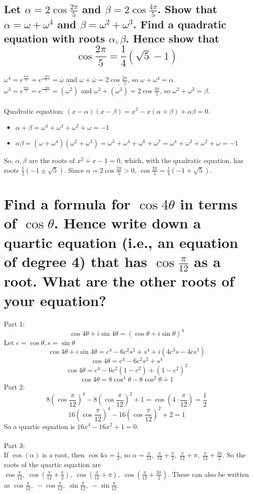 \documentclass[12pt]{article}
\begin{document}
\subsection{
    Let $\alpha = 2\cos\frac{2 \pi}{5}$ and $\beta = 2\cos\frac{4 \pi}{5}$.
    Show that $\alpha = \omega + \omega ^4$ and $\beta = \omega ^2 + \omega ^3$.
    Find a quadratic equation with roots $\alpha, \beta$. Hence show that
    $$\cos\frac{2 \pi}{5} = \frac{1}{4}(\sqrt{5}-1)$$
}
$\omega ^4 = e^{\frac{8 \pi i}{5}} = e^{\frac{-2 \pi i}{5}} = \bar{\omega}$ 
and $\omega + \bar{\omega} = 2\cos\frac{2 \pi}{5}$, so $\omega + \omega ^4 = \alpha$.\\
$\omega ^3 = e^{\frac{6 \pi i}{5}} = e^{\frac{-4 \pi i}{5}} = \bar{(\omega ^2)}$ 
and $\omega ^2 + \bar{(\omega ^2)} = 2\cos\frac{4 \pi}{5}$, so $\omega ^2 + \omega ^3 = \beta$.\\\\

Quadratic equation: $(x - \alpha)(x - \beta) = x^2 - x(\alpha + \beta) + \alpha \beta = 0$.
\begin{itemize}
    \item $\alpha + \beta = \omega ^4 + \omega ^3 + \omega ^2 + \omega = -1$
    \item $\alpha \beta = (\omega + \omega ^4)(\omega ^2 + \omega ^3) = \omega ^3 + \omega ^4 + \omega ^6 + \omega ^7 = \omega ^4 + \omega ^3 + \omega ^2 + \omega = -1$
\end{itemize}
So, $\alpha, \beta$ are the roots of $x^2 + x - 1 = 0$, which, with the quadratic equation, has roots $\frac{1}{2}(-1 \pm \sqrt{5})$.
Since $\alpha = 2\cos\frac{2 \pi}{5} > 0$, $\cos\frac{2 \pi}{5} = \frac{1}{4}(-1+\sqrt{5})$.

\section{
    Find a formula for $\cos 4 \theta$ in terms of $\cos \theta$.
    Hence write down a quartic equation (i.e., an equation of degree 4) that has $\cos \frac{\pi}{12}$ as a root.
    What are the other roots of your equation?
}
Part 1:
$$\cos 4 \theta + i \sin 4 \theta = (\cos \theta + i \sin \theta)^4$$
Let $c = \cos \theta, s = \sin \theta$
$$\cos 4 \theta + i \sin 4 \theta = c^4 - 6c^2s^2 + s^4 + i(4c^3s - 4cs^3)$$
$$\cos 4 \theta = c^4 - 6c^2s^2 + s^4$$
$$\cos 4 \theta = c^4 - 6c^2(1-c^2) + (1-c^2)^2$$
$$\cos 4 \theta = 8\cos ^4 \theta - 8\cos ^2 \theta + 1$$
Part 2:
$$8(\cos\frac{\pi}{12})^4 - 8(\cos\frac{\pi}{12})^2 + 1 = \cos(4 \cdotp \frac{\pi}{12}) = \frac{1}{2}$$
$$16(\cos\frac{\pi}{12})^4 - 16(\cos\frac{\pi}{12})^2 + 2 = 1$$
So a quartic equation is $16x^4 - 16x^2 + 1 = 0$.\\\\
Part 3:\\
If $\cos(\alpha)$ is a root, then $\cos 4 \alpha = \frac{1}{2}$, so $\alpha = \frac{\pi}{12}, \; \frac{\pi}{12} + \frac{\pi}{2}, \; \frac{\pi}{12}+ \pi, \; \frac{\pi}{12} + \frac{3 \pi}{2}$.
So the roots of the quartic equation are $\cos\frac{\pi}{12}, \; \cos(\frac{\pi}{12} + \frac{\pi}{2}), \; \cos(\frac{\pi}{12}+ \pi), \; \cos(\frac{\pi}{12} + \frac{3 \pi}{2})$.
These can also be written as $\cos\frac{\pi}{12}, \; -\cos\frac{\pi}{12}, \; \sin\frac{\pi}{12}, \; -\sin\frac{\pi}{12}$.
\end{document}
